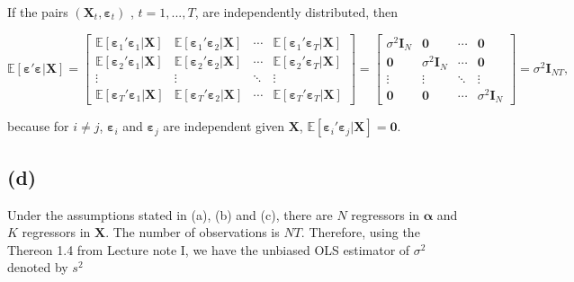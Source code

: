 \documentclass[
]{article}
\begin{document}
If the pairs \((\boldsymbol{X}_t,\boldsymbol{\varepsilon}_t)\) ,
\(t=1,...,T\), are independently distributed, then

\[\mathbb{E}[\boldsymbol{\varepsilon}'\boldsymbol{\varepsilon}|\boldsymbol{X}] = \begin{bmatrix}\mathbb{E}[\boldsymbol{\varepsilon}_1'\boldsymbol{\varepsilon}_1|\boldsymbol{X}] & \mathbb{E}[\boldsymbol{\varepsilon}_1'\boldsymbol{\varepsilon}_2|\boldsymbol{X}] & \cdots & \mathbb{E}[\boldsymbol{\varepsilon}_1'\boldsymbol{\varepsilon}_T|\boldsymbol{X}] \\ \mathbb{E}[\boldsymbol{\varepsilon}_2'\boldsymbol{\varepsilon}_1|\boldsymbol{X}] & \mathbb{E}[\boldsymbol{\varepsilon}_2'\boldsymbol{\varepsilon}_2|\boldsymbol{X}] & \cdots & \mathbb{E}[\boldsymbol{\varepsilon}_2'\boldsymbol{\varepsilon}_T|\boldsymbol{X}] \\ \vdots & \vdots & \ddots & \vdots \\ \mathbb{E}[\boldsymbol{\varepsilon}_T'\boldsymbol{\varepsilon}_1|\boldsymbol{X}] & \mathbb{E}[\boldsymbol{\varepsilon}_T'\boldsymbol{\varepsilon}_2|\boldsymbol{X}] & \cdots & \mathbb{E}[\boldsymbol{\varepsilon}_T'\boldsymbol{\varepsilon}_T|\boldsymbol{X}]\end{bmatrix} = \begin{bmatrix}\sigma^2\boldsymbol{I}_N & \boldsymbol{0} & \cdots & \boldsymbol{0} \\ \boldsymbol{0} & \sigma^2\boldsymbol{I}_N & \cdots & \boldsymbol{0}\\ \vdots & \vdots & \ddots & \vdots \\ \boldsymbol{0} & \boldsymbol{0} & \cdots & \sigma^2\boldsymbol{I}_N\end{bmatrix}=\sigma^2\boldsymbol{I}_{NT},\]

because for \(i \neq j\), \(\boldsymbol{\varepsilon}_i\) and
\(\boldsymbol{\varepsilon}_j\) are independent given \(\boldsymbol{X}\),
\(\mathbb{E}[\boldsymbol{\varepsilon}_i'\boldsymbol{\varepsilon}_j|\boldsymbol{X}] = \boldsymbol{0}\).

\hypertarget{d}{%
\subsection{(d)}\label{d}}

Under the assumptions stated in (a), (b) and (c), there are \(N\)
regressors in \(\boldsymbol{\alpha}\) and \(K\) regressors in
\(\boldsymbol{X}\). The number of observations is \(NT\). Therefore,
using the Thereon 1.4 from Lecture note I, we have the unbiased OLS
estimator of \(\sigma^2\) denoted by \(s^2\)
\end{document}
